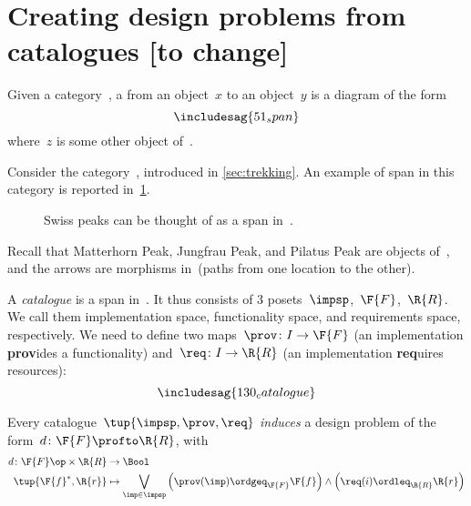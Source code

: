 

\section{Creating design problems from catalogues [to change]}
\label{sec:spans}

\begin{ctdefinition}[Span]
  \label{def:span}
  Given a category~\CatC, a \emph{} from an object~$x$ to an object~$y$ is a diagram of the form
  \begin{equation}
    \includesag{51_span}
  \end{equation}
  where~$z$ is some other object of~\CatC.
\end{ctdefinition}

\begin{example}
  Consider the category~\Berg, introduced in \cref{sec:trekking}. An example of span in this category is reported in~\cref{fig:exmountains}.
  \begin{figure}[h!]
    \begin{center}
    \end{center}
    \caption{Swiss peaks can be thought of as a span in~\Trek. \label{fig:exmountains}}
  \end{figure}
  Recall that \textsf{Matterhorn Peak}, \textsf{Jungfrau Peak}, and \textsf{Pilatus Peak} are objects of~\Trek, and the arrows are morphisms in~\Trek (paths from one location to the other).
\end{example}

\begin{definition}[Catalogue]
  \label{def:catalogue}
  A \emph{catalogue} is a span in~\Pos.
  It thus consists of 3 posets~$\impsp$,~$\F{F}$,~$\R{R}$.
  We call them implementation space, functionality space, and requirements space, respectively. We need to define two maps~$\prov \colon I \to \F{F}$ (an implementation \textbf{prov}ides a functionality) and~$\req\colon I \to \R{R}$ (an implementation \textbf{req}uires resources):
  \begin{equation*}
    \includesag{130_catalogue}
  \end{equation*}
\end{definition}

\begin{definition}
  Every catalogue~$\tup{\impsp,\prov,\req}$ \emph{induces} a design problem of the form~$d\colon \F{F}\profto \R{R}$, with
  \begin{equation*}
    \begin{aligned}
      d\colon \F{F}\op \times \R{R}&\to \Bool\\
      \tup{\F{f}^*,\R{r}}&\mapsto \bigvee_{\imp\in \impsp}\left(\prov(\imp)\ordgeq_{\F{F}}\F{f} \right)\wedge \left( \req(i)\ordleq_{\R{R}}\R{r}\right)
    \end{aligned}
  \end{equation*}
\end{definition}
